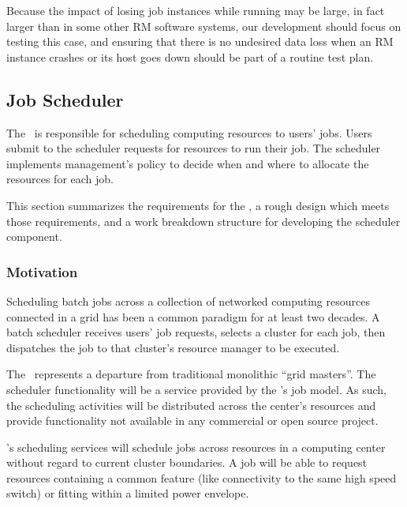 Because the impact of losing job instances while running may be
large, in fact larger than in some other RM software systems,
our development should focus on testing this case, and ensuring
that there is no undesired data loss when an RM instance crashes
or its host goes down should be part of a routine test plan.


\subsection{Job Scheduler}

\ifcomments
{}
\fi

The \ngjs\ is responsible for scheduling computing resources to users'
jobs.  Users submit to the scheduler requests for resources to run
their job.  The scheduler implements management's policy to decide
when and where to allocate the resources for each job.

This section summarizes the requirements for the \ngjs, a rough design
which meets those requirements, and a work breakdown structure for
developing the scheduler component.

\subsubsection{Motivation}

Scheduling batch jobs across a collection of networked computing
resources connected in a grid has been a common paradigm for at least
two decades.  A batch scheduler receives users' job requests, selects
a cluster for each job, then dispatches the job to that cluster's
resource manager to be executed.

The \ngjs\ represents a departure from traditional monolithic ``grid
masters''.  The scheduler functionality will be a service provided by
the \ngrm's job model.  As such, the scheduling activities will be
distributed across the center's resources and provide functionality
not available in any commercial or open source project.

\ngjs's scheduling services will schedule jobs across resources in a
computing center without regard to current cluster boundaries.  A job
will be able to request resources containing a common feature (like
connectivity to the same high speed switch) or fitting within a
limited power envelope.

